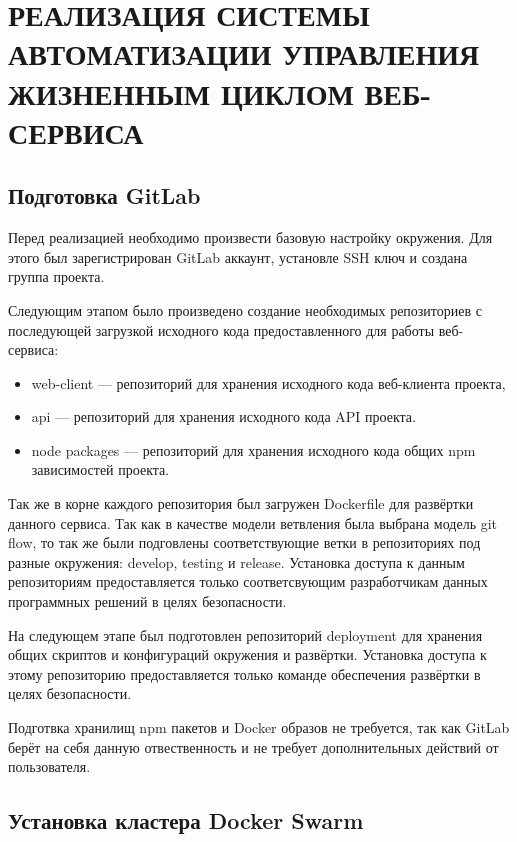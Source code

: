 \chapter{РЕАЛИЗАЦИЯ СИСТЕМЫ АВТОМАТИЗАЦИИ УПРАВЛЕНИЯ ЖИЗНЕННЫМ ЦИКЛОМ ВЕБ-СЕРВИСА}
\label{cha:impl}

\section{Подготовка GitLab}

Перед реализацией необходимо произвести базовую настройку окружения.
Для этого был зарегистрирован GitLab аккаунт, установле SSH ключ и создана группа проекта.

Следующим этапом было произведено создание необходимых репозиториев с последующей загрузкой исходного кода предоставленного для работы веб-сервиса:

\begin{itemize}
    \item web-client --- репозиторий для хранения исходного кода веб-клиента проекта,
    \item api --- репозиторий для хранения исходного кода API проекта.
    \item node packages --- репозиторий для хранения исходного кода общих npm зависимостей проекта.
\end{itemize}

Так же в корне каждого репозитория был загружен Dockerfile для развёртки данного сервиса.
Так как в качестве модели ветвления была выбрана модель git flow, то так же были подговлены соответствующие ветки в репозиториях под разные окружения: develop, testing и release.
Установка доступа к данным репозиториям предоставляется только соответсвующим разработчикам данных программных решений в целях безопасности.

На следующем этапе был подготовлен репозиторий deployment для хранения общих скриптов и конфигураций окружения и развёртки.
Установка доступа к этому репозиторию предоставляется только команде обеспечения развёртки в целях безопасности.

Подготвка хранилищ npm пакетов и Docker образов не требуется, так как GitLab берёт на себя данную отвественность и не требует дополнительных действий от пользователя.

\section{Установка кластера Docker Swarm}

